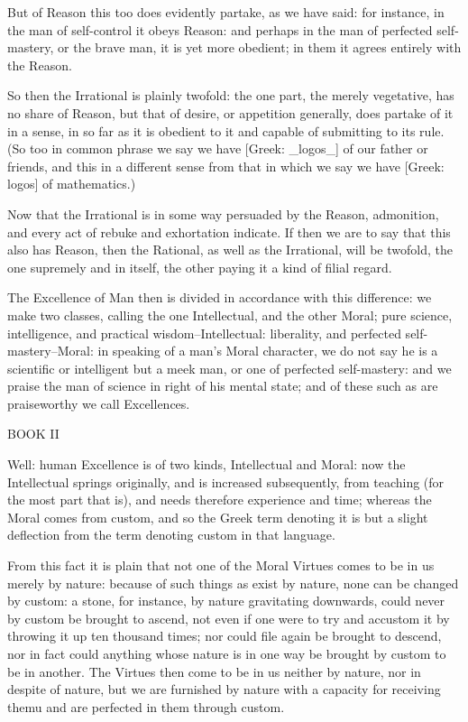 But of Reason this too does evidently partake, as we have said: for
instance, in the man of self-control it obeys Reason: and perhaps in
the man of perfected self-mastery, or the brave man, it is yet more
obedient; in them it agrees entirely with the Reason.

So then the Irrational is plainly twofold: the one part, the merely
vegetative, has no share of Reason, but that of desire, or appetition
generally, does partake of it in a sense, in so far as it is obedient to
it and capable of submitting to its rule. (So too in common phrase we
say we have [Greek: _logos_] of our father or friends, and this in a
different sense from that in which we say we have [Greek: logos] of
mathematics.)

Now that the Irrational is in some way persuaded by the Reason,
admonition, and every act of rebuke and exhortation indicate. If then we
are to say that this also has Reason, then the Rational, as well as the
Irrational, will be twofold, the one supremely and in itself, the other
paying it a kind of filial regard.

The Excellence of Man then is divided in accordance with this
difference: we make two classes, calling the one Intellectual, and
the other Moral; pure science, intelligence, and practical
wisdom--Intellectual: liberality, and perfected self-mastery--Moral: in
speaking of a man's Moral character, we do not say he is a scientific
or intelligent but a meek man, or one of perfected self-mastery: and we
praise the man of science in right of his mental state; and of these
such as are praiseworthy we call Excellences.




BOOK II

Well: human Excellence is of two kinds, Intellectual and Moral: now the
Intellectual springs originally, and is increased subsequently, from
teaching (for the most part that is), and needs therefore experience
and time; whereas the Moral comes from custom, and so the Greek term
denoting it is but a slight deflection from the term denoting custom in
that language.

From this fact it is plain that not one of the Moral Virtues comes to be
in us merely by nature: because of such things as exist by nature, none
can be changed by custom: a stone, for instance, by nature gravitating
downwards, could never by custom be brought to ascend, not even if one
were to try and accustom it by throwing it up ten thousand times; nor
could file again be brought to descend, nor in fact could anything whose
nature is in one way be brought by custom to be in another. The Virtues
then come to be in us neither by nature, nor in despite of nature, but
we are furnished by nature with a capacity for receiving themu and are
perfected in them through custom.

